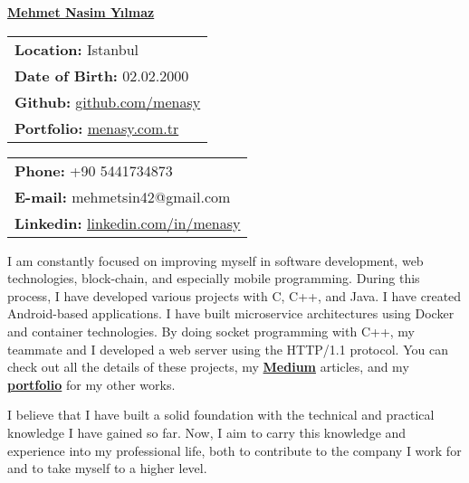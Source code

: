 \documentclass[a4paper,11pt]{article}
\begin{document}
\vspace*{-6.5em} 
\begin{center}
    \href{https://menasy.com.tr/}{\LARGE \textbf{Mehmet Nasim Yılmaz}}
\end{center}
\vspace*{0.5em} 
\noindent
\begin{minipage}[t]{0.48\textwidth}
    \begin{tabular}{@{}l}
        \textbf{Location:} Istanbul \\
        \textbf{Date of Birth:} 02.02.2000 \\
        \textbf{Github:} \href{https://github.com/menasy}{github.com/menasy} \\
        \textbf{Portfolio:} \href{https://menasy.com.tr/}{menasy.com.tr} \\
    \end{tabular}
\end{minipage}%
\hfill
\begin{minipage}[t]{0.48\textwidth}
    \raggedleft
    \begin{tabular}{@{}l}
        \textbf{Phone:} +90 5441734873 \\
        \textbf{E-mail:} mehmetsin42@gmail.com \\
        \textbf{Linkedin:} \href{https://linkedin.com/in/menasy}{linkedin.com/in/menasy} \\
    \end{tabular}
\end{minipage}

\vspace{0.7em}

I am constantly focused on improving myself in software development, web technologies, block-chain, and especially mobile programming. During this process, I have developed various projects with C, C++, and Java. I have created Android-based applications. I have built microservice architectures using Docker and container technologies. By doing socket programming with C++, my teammate and I developed a web server using the HTTP/1.1 protocol. You can check out all the details of these projects, my \textbf{\href{https://medium.com/@menasy}{Medium}} articles, and my \textbf{\href{https://menasy.com.tr/}{portfolio}} for my other works.
\vspace{-0.5em}

I believe that I have built a solid foundation with the technical and practical knowledge I have gained so far. Now, I aim to carry this knowledge and experience into my professional life, both to contribute to the company I work for and to take myself to a higher level.
\vspace{-0.5em}
\end{document}
